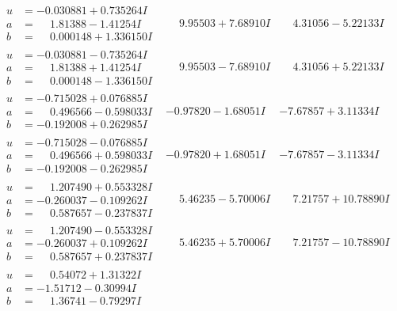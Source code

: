 \documentclass[1p]{elsarticle_modified}
\theoremstyle{definition}
\begin{document}
$$\begin{array}{c|c|c}
\begin{aligned}
u &= -0.030881 + 0.735264 I \\
a &= \phantom{-}1.81388 - 1.41254 I \\
b &= \phantom{-}0.000148 + 1.336150 I\end{aligned}
 & \phantom{-}9.95503 + 7.68910 I & \phantom{-}4.31056 - 5.22133 I \\ \hline\begin{aligned}
u &= -0.030881 - 0.735264 I \\
a &= \phantom{-}1.81388 + 1.41254 I \\
b &= \phantom{-}0.000148 - 1.336150 I\end{aligned}
 & \phantom{-}9.95503 - 7.68910 I & \phantom{-}4.31056 + 5.22133 I \\ \hline\begin{aligned}
u &= -0.715028 + 0.076885 I \\
a &= \phantom{-}0.496566 - 0.598033 I \\
b &= -0.192008 + 0.262985 I\end{aligned}
 & -0.97820 - 1.68051 I & -7.67857 + 3.11334 I \\ \hline\begin{aligned}
u &= -0.715028 - 0.076885 I \\
a &= \phantom{-}0.496566 + 0.598033 I \\
b &= -0.192008 - 0.262985 I\end{aligned}
 & -0.97820 + 1.68051 I & -7.67857 - 3.11334 I \\ \hline\begin{aligned}
u &= \phantom{-}1.207490 + 0.553328 I \\
a &= -0.260037 - 0.109262 I \\
b &= \phantom{-}0.587657 - 0.237837 I\end{aligned}
 & \phantom{-}5.46235 - 5.70006 I & \phantom{-}7.21757 + 10.78890 I \\ \hline\begin{aligned}
u &= \phantom{-}1.207490 - 0.553328 I \\
a &= -0.260037 + 0.109262 I \\
b &= \phantom{-}0.587657 + 0.237837 I\end{aligned}
 & \phantom{-}5.46235 + 5.70006 I & \phantom{-}7.21757 - 10.78890 I \\ \hline\begin{aligned}
u &= \phantom{-}0.54072 + 1.31322 I \\
a &= -1.51712 - 0.30994 I \\
b &= \phantom{-}1.36741 - 0.79297 I\end{aligned}

\end{array}$$
\end{document}
